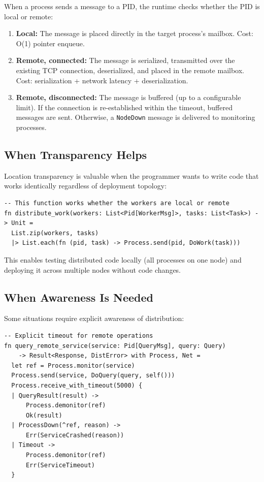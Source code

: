 \documentclass[11pt,a4paper]{article}
\begin{document}
When a process sends a message to a PID, the runtime checks whether the
PID is local or remote:

\begin{enumerate}[nosep]
  \item \textbf{Local:} The message is placed directly in the target
        process's mailbox. Cost: O(1) pointer enqueue.
  \item \textbf{Remote, connected:} The message is serialized,
        transmitted over the existing TCP connection, deserialized, and
        placed in the remote mailbox. Cost: serialization +
        network latency + deserialization.
  \item \textbf{Remote, disconnected:} The message is buffered (up to a
        configurable limit). If the connection is re-established within
        the timeout, buffered messages are sent. Otherwise, a
        \texttt{NodeDown} message is delivered to monitoring processes.
\end{enumerate}

\subsection{When Transparency Helps}

Location transparency is valuable when the programmer wants to write
code that works identically regardless of deployment topology:

\begin{lstlisting}
-- This function works whether the workers are local or remote
fn distribute_work(workers: List<Pid[WorkerMsg]>, tasks: List<Task>) -> Unit =
  List.zip(workers, tasks)
  |> List.each(fn (pid, task) -> Process.send(pid, DoWork(task)))
\end{lstlisting}

This enables testing distributed code locally (all processes on one node)
and deploying it across multiple nodes without code changes.

\subsection{When Awareness Is Needed}

Some situations require explicit awareness of distribution:

\begin{lstlisting}
-- Explicit timeout for remote operations
fn query_remote_service(service: Pid[QueryMsg], query: Query)
    -> Result<Response, DistError> with Process, Net =
  let ref = Process.monitor(service)
  Process.send(service, DoQuery(query, self()))
  Process.receive_with_timeout(5000) {
  | QueryResult(result) ->
      Process.demonitor(ref)
      Ok(result)
  | ProcessDown(^ref, reason) ->
      Err(ServiceCrashed(reason))
  | Timeout ->
      Process.demonitor(ref)
      Err(ServiceTimeout)
  }
\end{lstlisting}
\end{document}
